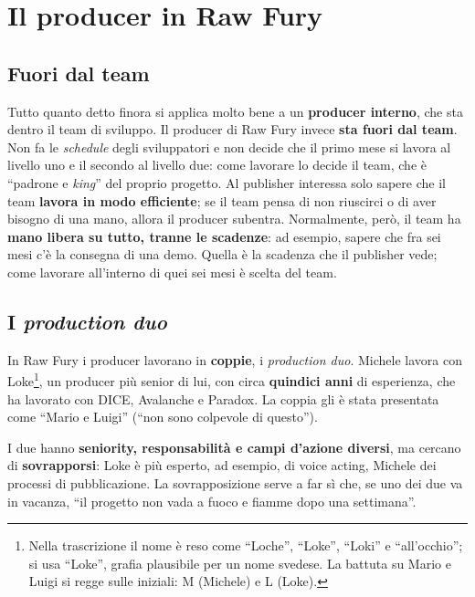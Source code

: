 \section{Il producer in Raw Fury}
\label{sec:z4-producer-raw-fury}

\subsection{Fuori dal team}

Tutto quanto detto finora si applica molto bene a un \textbf{producer
interno}, che sta dentro il team di sviluppo. Il producer di Raw Fury invece
\textbf{sta fuori dal team}. Non fa le \emph{schedule} degli sviluppatori e non
decide che il primo mese si lavora al livello uno e il secondo al livello due:
come lavorare lo decide il team, che è ``padrone e \emph{king}'' del proprio
progetto. Al publisher interessa solo sapere che il team \textbf{lavora in modo
efficiente}; se il team pensa di non riuscirci o di aver bisogno di una mano,
allora il producer subentra. Normalmente, però, il team ha \textbf{mano libera su
tutto, tranne le scadenze}: ad esempio, sapere che fra sei mesi c'è la
consegna di una demo. Quella è la scadenza che il publisher vede; come
lavorare all'interno di quei sei mesi è scelta del team.

\subsection{I \emph{production duo}}

In Raw Fury i producer lavorano in \textbf{coppie}, i \emph{production duo}.
Michele lavora con Loke\footnote{Nella trascrizione il nome è reso come
``Loche'', ``Loke'', ``Loki'' e ``all'occhio''; si usa ``Loke'', grafia
plausibile per un nome svedese. La battuta su Mario e Luigi si regge sulle
iniziali: M (Michele) e L (Loke).}, un producer più senior di lui, con circa
\textbf{quindici anni} di esperienza, che ha lavorato con DICE, Avalanche e
Paradox. La coppia gli è stata presentata come ``Mario e Luigi'' (``non sono
colpevole di questo'').

I due hanno \textbf{seniority, responsabilità e campi d'azione diversi}, ma
cercano di \textbf{sovrapporsi}: Loke è più esperto, ad esempio, di voice
acting, Michele dei processi di pubblicazione. La sovrapposizione serve a far
sì che, se uno dei due va in vacanza, ``il progetto non vada a fuoco e fiamme
dopo una settimana''.

